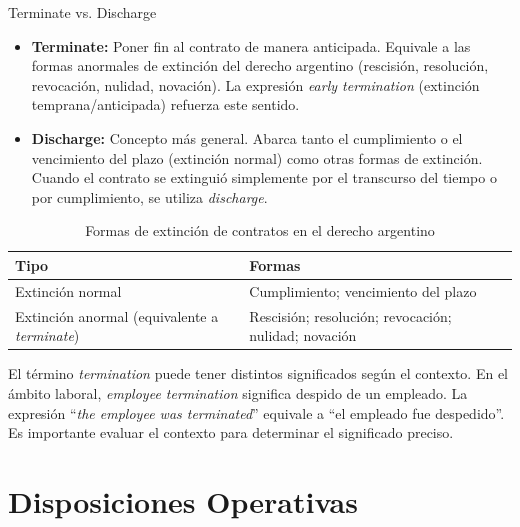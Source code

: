 \documentclass[12pt,oneside]{book}
\begin{document}
\begin{definition}{Terminate vs. Discharge}
\begin{itemize}
    \item \textbf{Terminate:} Poner fin al contrato de manera anticipada.
    Equivale a las formas anormales de extinción del derecho argentino
    (rescisión, resolución, revocación, nulidad, novación). La expresión
    \textit{early termination} (extinción temprana/anticipada) refuerza
    este sentido.
    \item \textbf{Discharge:} Concepto más general. Abarca tanto el
    cumplimiento o el vencimiento del plazo (extinción normal) como otras
    formas de extinción. Cuando el contrato se extinguió simplemente por
    el transcurso del tiempo o por cumplimiento, se utiliza \textit{discharge}.
\end{itemize}
\end{definition}

\begin{table}[H]
\centering
\caption{Formas de extinción de contratos en el derecho argentino}
\begin{tabularx}{\textwidth}{
    >{\raggedright\arraybackslash}p{}
    >{\raggedright\arraybackslash}X
}
\toprule
\textbf{Tipo} & \textbf{Formas} \\
\midrule
Extinción normal & Cumplimiento; vencimiento del plazo \\
\addlinespace
Extinción anormal (equivalente a \textit{terminate}) & Rescisión; resolución; revocación; nulidad; novación \\
\bottomrule
\end{tabularx}
\end{table}

\begin{note}
El término \textit{termination} puede tener distintos significados según
el contexto. En el ámbito laboral, \textit{employee termination} significa
despido de un empleado. La expresión ``\textit{the employee was terminated}''
equivale a ``el empleado fue despedido''. Es importante evaluar el contexto
para determinar el significado preciso.
\end{note}

\chapter{Disposiciones Operativas}
\end{document}
